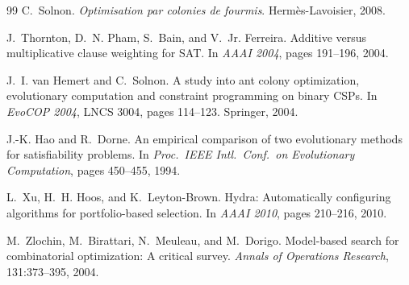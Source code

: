 \documentclass[12pt,a4paper]{book}
\begin{document}
\begin{thebibliography}{99}
C.~Solnon.
\newblock \textit{Optimisation par colonies de fourmis}.
\newblock Hermès-Lavoisier, 2008.

J.~Thornton, D.~N. Pham, S.~Bain, and V.~Jr. Ferreira.
\newblock Additive versus multiplicative clause weighting for SAT.
\newblock In \textit{AAAI 2004}, pages 191--196, 2004.

J.~I. van Hemert and C.~Solnon.
\newblock A study into ant colony optimization, evolutionary computation and constraint programming on binary CSPs.
\newblock In \textit{EvoCOP 2004}, LNCS 3004, pages 114--123. Springer, 2004.

J.-K. Hao and R.~Dorne.
\newblock An empirical comparison of two evolutionary methods for satisfiability problems.
\newblock In \textit{Proc.\ IEEE Intl.\ Conf.\ on Evolutionary Computation}, pages 450--455, 1994.

L.~Xu, H.~H. Hoos, and K.~Leyton-Brown.
\newblock Hydra: Automatically configuring algorithms for portfolio-based selection.
\newblock In \textit{AAAI 2010}, pages 210--216, 2010.

M.~Zlochin, M.~Birattari, N.~Meuleau, and M.~Dorigo.
\newblock Model-based search for combinatorial optimization: A critical survey.
\newblock \textit{Annals of Operations Research}, 131:373--395, 2004.

\end{thebibliography}
\end{document}
